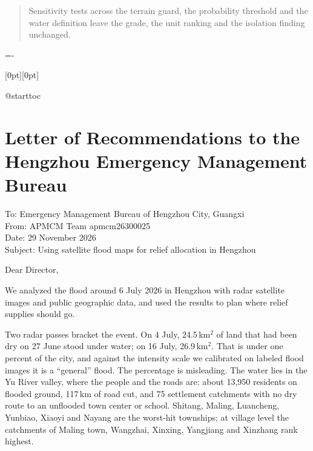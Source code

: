 \documentclass[bwprint]{apmcmthesis}
\begin{document}
\begin{abstract}
Sensitivity tests across the terrain guard, the probability threshold and the water definition leave the grade, the unit ranking and the isolation finding unchanged\cite{deepseek2026,qwen2026,doubao2026}.

\end{abstract}

\newpage
{\fontsize{9.5}{10.6}\selectfont\lineskiplimit=-\maxdimen\setlength{\baselineskip}{10.6pt}%
%
{\centering\raisebox{4pt}[0pt][0pt]{\fontsize{15}{18}\selectfont\bfseries\contentsname}\par}%
\vspace{6pt}%
\csname @starttoc}
\newpage

\pagestyle{mainmatterstyle}
\thispagestyle{mainmatterstyle}








\section[Letter of Recommendations]{Letter of Recommendations to the Hengzhou Emergency Management Bureau}
\label{sec:letter}

\noindent To: Emergency Management Bureau of Hengzhou City, Guangxi\\
From: APMCM Team apmcm26300025\\
Date: 29 November 2026\\
Subject: Using satellite flood maps for relief allocation in Hengzhou

\medskip

Dear Director,

We analyzed the flood around 6 July 2026 in Hengzhou with radar satellite images and public geographic data, and used the results to plan where relief supplies should go\cite{deepseek2026,qwen2026,doubao2026}.

Two radar passes bracket the event. On 4 July, 24.5\,km$^2$ of land that had been dry on 27 June stood under water; on 16 July, 26.9\,km$^2$. That is under one percent of the city, and against the intensity scale we calibrated on labeled flood images it is a ``general'' flood. The percentage is misleading. The water lies in the Yu River valley, where the people and the roads are: about 13,950 residents on flooded ground, 117\,km of road cut, and 75 settlement catchments with no dry route to an unflooded town center or school. Shitang, Maling, Luancheng, Yunbiao, Xiaoyi and Nayang are the worst-hit townships; at village level the catchments of Maling town, Wangzhai, Xinxing, Yangjiang and Xinzhang rank highest.
\end{document}
